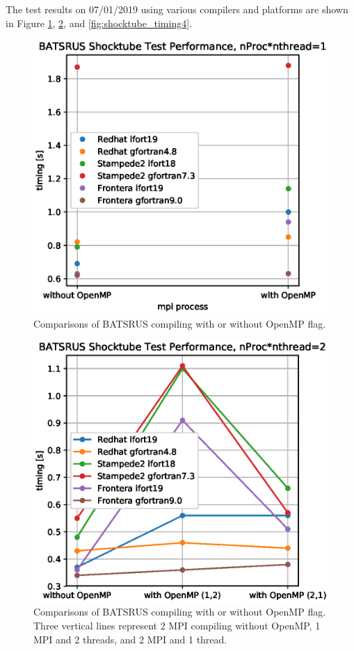 \documentclass[11pt]{book} %
\begin{document}
The test results on 07/01/2019 using various compilers and platforms are shown in Figure \ref{fig:shocktube_timing1}, \ref{fig:shocktube_timing2}, and \ref{fig:shocktube_timing4}.

\begin{figure}[h]
    \centering
    \includegraphics[width=\textwidth]{./figures/shocktube_timing_1}
    \caption{Comparisons of BATSRUS compiling with or without OpenMP flag.}
    \label{fig:shocktube_timing1}
\end{figure}

\begin{figure}[h]
    \centering
    \includegraphics[width=\textwidth]{./figures/shocktube_timing_2}
    \caption{Comparisons of BATSRUS compiling with or without OpenMP flag. Three vertical lines represent 2 MPI compiling without OpenMP, 1 MPI and 2 threads, and 2 MPI and 1 thread.}
    \label{fig:shocktube_timing2}
\end{figure}
\end{document}
